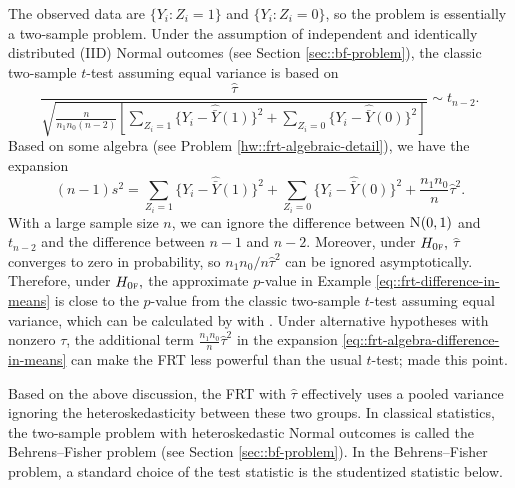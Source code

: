 The observed data are $\{  Y_i: Z_i = 1 \}$ and $\{ Y_i : Z_i = 0 \}$, so the problem is essentially a two-sample problem. 
Under the assumption of independent and identically distributed (IID) Normal outcomes (see Section \ref{sec::bf-problem}), the classic two-sample $t$-test assuming equal variance is based on
\begin{equation}\label{eq::two-sample-t-equalv}
\frac{  \hat{\tau}      }{  \sqrt{\frac{n}{n_1 n_0(n-2)}  \left[  \sum_{Z_i=1}  \{Y_i - \hat{\bar{Y}}(1)\}^2
+ \sum_{Z_i=0}  \{Y_i - \hat{\bar{Y}}(0)\}^2
    \right]  }    }   \sim t_{n-2}.
\end{equation}
Based on some algebra (see Problem \ref{hw::frt-algebraic-detail}), we have the expansion 
\begin{equation}\label{eq::frt-algebra-difference-in-means}
(n-1)s^2 = \sum_{Z_i=1}  \{Y_i - \hat{\bar{Y}}(1)\}^2 + \sum_{Z_i=0}  \{Y_i - \hat{\bar{Y}}(0)\}^2
+ \frac{n_1 n_0}{n} \hat{\tau}^2 .
\end{equation}
With a large sample size $n$, we can ignore the difference between $\N01$ and $t_{n-2}$ and the difference between $n-1$ and $n-2$.
Moreover, under $H_{0\textsc{f}},$ $\hat{\tau}$ converges to zero in probability, so $ n_1 n_0 / n \hat{\tau}^2$ can be ignored asymptotically. Therefore, under $H_{0\textsc{f}},$ the approximate $p$-value in Example \ref{eq::frt-difference-in-means} is close to the $p$-value from the classic two-sample $t$-test assuming equal variance, which can be calculated by  with . Under alternative hypotheses with nonzero $\tau$, the additional term $\frac{n_1 n_0}{n} \hat{\tau}^2$ in the expansion \eqref{eq::frt-algebra-difference-in-means} can make the FRT less powerful than the usual $t$-test; \citet{Ding:2014} made this point. 


Based on the above discussion, the FRT with $\hat{\tau}$ effectively uses a pooled variance ignoring the heteroskedasticity between these two groups. In classical statistics, the two-sample problem with heteroskedastic Normal outcomes is called the Behrens--Fisher problem (see Section \ref{sec::bf-problem}). In the Behrens--Fisher problem, a standard choice of the test statistic is the studentized statistic below. 



